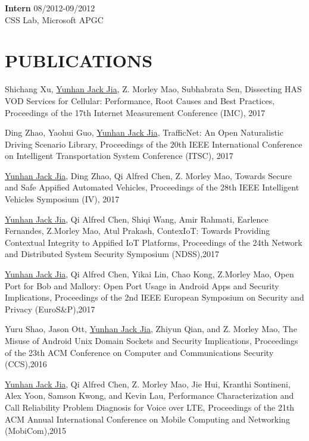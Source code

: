 \documentclass[margin]{res}
\begin{document}
\begin{resume}
\textbf{Intern} \hfill 08/2012-09/2012 \\
CSS Lab, Microsoft APGC


\section{PUBLICATIONS}

Shichang Xu, \underline{Yunhan Jack Jia}, Z. Morley Mao, Subhabrata Sen,
Dissecting HAS VOD Services for Cellular: Performance, Root Causes and Best Practices, Proceedings of the 17th Internet Measurement Conference (IMC), 2017

Ding Zhao, Yaohui Guo, \underline{Yunhan Jack Jia}, 
TrafficNet: An Open Naturalistic Driving Scenario Library, Proceedings of the 20th IEEE International Conference on Intelligent Transportation System Conference (ITSC), 2017 \href{http://web.eecs.umich.edu/\~jackjia/material/trafficnet\_itsc17.pdf}{\color{blue}{[PDF]}}

\underline{Yunhan Jack Jia}, Ding Zhao, Qi Alfred Chen, Z. Morley Mao,
Towards Secure and Safe Appified Automated Vehicles, Proceedings of the 28th IEEE Intelligent Vehicles Symposium (IV), 2017 \href{https://arxiv.org/pdf/1702.06827.pdf}{\color{blue}{[PDF]}}

\underline{Yunhan Jack Jia}, Qi Alfred Chen, Shiqi Wang, Amir Rahmati, Earlence Fernandes, Z.Morley Mao, Atul Prakash, 
ContexIoT: Towards Providing Contextual Integrity to Appified IoT Platforms, Proceedings of the 24th Network and Distributed System Security Symposium (NDSS),2017 \href{http://web.eecs.umich.edu/\~jackjia/material/contexiot\_ndss17.pdf}{\color{blue}{[PDF]}}

\underline{Yunhan Jack Jia}, Qi Alfred Chen, Yikai Lin, Chao Kong, Z.Morley Mao, 
Open Port for Bob and Mallory: Open Port Usage in Android Apps and Security Implications, Proceedings of the 2nd IEEE European Symposium on Security and Privacy (EuroS\&P),2017 \href{http://web.eecs.umich.edu/\~jackjia/material/open\_euro17.pdf}{\color{blue}{[PDF]}}

Yuru Shao, Jason Ott, \underline{Yunhan Jack Jia}, Zhiyun Qian, and Z. Morley Mao,
The Misuse of Android Unix Domain Sockets and Security Implications, Proceedings of the 23th ACM Conference on Computer and Communications Security (CCS),2016 \href{http://web.eecs.umich.edu/\~jackjia/material/misuse\_ccs16.pdf}{\color{blue}{[PDF]}}

\underline{Yunhan Jack Jia}, Qi Alfred Chen, Z. Morley Mao, Jie Hui, Kranthi Sontineni, Alex Yoon, Samson Kwong, and Kevin Lau, 
Performance Characterization and Call Reliability Problem Diagnosis for Voice over LTE, Proceedings of the 21th ACM Annual 
International Conference on Mobile Computing and Networking (MobiCom),2015 \href{http://web.eecs.umich.edu/\~jackjia/material/performance\_mobicom15.pdf}{\color{blue}{[PDF]}}


\end{resume}
\end{document}
